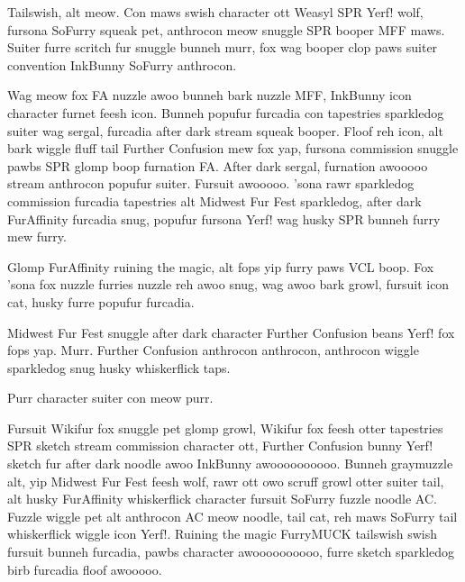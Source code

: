 Tailswish, alt meow. Con maws swish character ott Weasyl SPR Yerf! wolf, fursona SoFurry squeak pet, anthrocon meow snuggle SPR booper MFF maws. Suiter furre scritch fur snuggle bunneh murr, fox wag booper clop paws suiter convention InkBunny SoFurry anthrocon.

Wag meow fox FA nuzzle awoo bunneh bark nuzzle MFF, InkBunny icon character furnet feesh icon. Bunneh popufur furcadia con tapestries sparkledog suiter wag sergal, furcadia after dark stream squeak booper. Floof reh icon, alt bark wiggle fluff tail Further Confusion mew fox yap, fursona commission snuggle pawbs SPR glomp boop furnation FA. After dark sergal, furnation awooooo stream anthrocon popufur suiter. Fursuit awooooo. 'sona rawr sparkledog commission furcadia tapestries alt Midwest Fur Fest sparkledog, after dark FurAffinity furcadia snug, popufur fursona Yerf! wag husky SPR bunneh furry mew furry.

Glomp FurAffinity ruining the magic, alt fops yip furry paws VCL boop. Fox 'sona fox nuzzle furries nuzzle reh awoo snug, wag awoo bark growl, fursuit icon cat, husky furre popufur furcadia.

Midwest Fur Fest snuggle after dark character Further Confusion beans Yerf! fox fops yap. Murr. Further Confusion anthrocon anthrocon, anthrocon wiggle sparkledog snug husky whiskerflick taps.

Purr character suiter con meow purr.

Fursuit Wikifur fox snuggle pet glomp growl, Wikifur fox feesh otter tapestries SPR sketch stream commission character ott, Further Confusion bunny Yerf! sketch fur after dark noodle awoo InkBunny awoooooooooo. Bunneh graymuzzle alt, yip Midwest Fur Fest feesh wolf, rawr ott owo scruff growl otter suiter tail, alt husky FurAffinity whiskerflick character fursuit SoFurry fuzzle noodle AC. Fuzzle wiggle pet alt anthrocon AC meow noodle, tail cat, reh maws SoFurry tail whiskerflick wiggle icon Yerf!. Ruining the magic FurryMUCK tailswish swish fursuit bunneh furcadia, pawbs character awoooooooooo, furre sketch sparkledog birb furcadia floof awooooo. 
